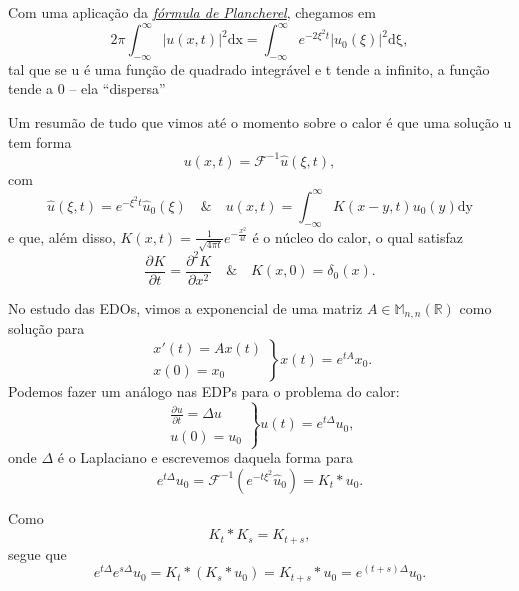 \documentclass[../pde_notes.tex]{subfiles}
\begin{document}
Com uma aplicação da \hyperlink{parseval_plancherel}{\textit{fórmula de Plancherel}}, chegamos em
\[
	2\pi \int_{-\infty}^{\infty}|u(x, t)|^{2} \mathrm{dx} = \int_{-\infty}^{\infty}e^{-2\xi^{2}t}|u_{0}(\xi )|^{2} \mathrm{d\xi },
\]
tal que se u é uma função de quadrado integrável e t tende a infinito, a função tende a 0 -- ela ``dispersa''

Um resumão de tudo que vimos até o momento sobre o calor é que uma solução u tem forma
\[
	u(x, t) = \mathcal{F}^{-1}\hat{u}(\xi , t),
\]
com
\[
	\hat{u}(\xi , t) = e^{-\xi^{2}t}\hat{u}_{0}(\xi ) \quad\&\quad u(x, t) = \int_{-\infty}^{\infty}K(x-y, t)u_{0}(y) \mathrm{dy}
\]
e que, além disso, \(K(x, t) = \frac{1}{\sqrt[]{4\pi t}}e^{-\frac{x^{2}}{4t}}\) é o núcleo do calor, o qual satisfaz
\[
	\frac{\partial^{}K}{\partial t^{}} = \frac{\partial^{2}K}{\partial x^{2}} \quad\&\quad K(x, 0) = \delta_{0}(x).
\]
\begin{tcolorbox}[
		skin=enhanced,
		title=Observação,
		fonttitle=\bfseries,
		colframe=black,
		colbacktitle=cyan!75!white,
		colback=cyan!15,
		colbacklower=black,
		coltitle=black,
		drop fuzzy shadow,
	]
	No estudo das EDOs, vimos a exponencial de uma matriz \(A\in \mathbb{M}_{n, n}(\mathbb{R})\) como solução para
	\[
		\left.\begin{array}{ll}
			x'(t) = Ax(t) \\
			x(0) = x_{0}
		\end{array}\right\}x(t) = e^{tA}x_{0}.
	\]
	Podemos fazer um análogo nas EDPs para o problema do calor:
	\[
		\left.\begin{array}{ll}
			\frac{\partial^{}u}{\partial t^{}} = \Delta u \\
			u(0) = u_{0}
		\end{array}\right\}u(t) = e^{t\Delta }u_{0},
	\]
	onde \(\Delta \) é o Laplaciano e escrevemos daquela forma para
	\[
		e^{t\Delta }u_{0} = \mathcal{F}^{-1}(e^{-t\xi^{2}}\hat{u}_{0}) = K_{t}*u_{0}.
	\]

	Como
	\[
		K_t*K_s = K_{t+s},
	\]
	segue que
	\[
		e^{t\Delta }e^{s\Delta } u_{0} = K_{t}*(K_{s}*u_{0}) = K_{t+s}*u_{0} = e^{(t+s)\Delta }u_{0}.
	\]
\end{tcolorbox}
\end{document}
